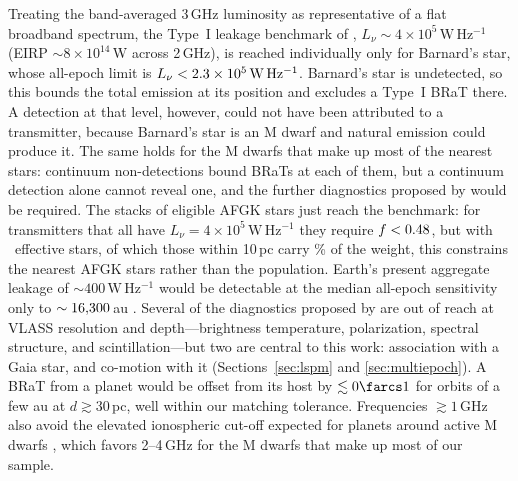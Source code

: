 \documentclass[linenumbers]{aastex702}
\newcommand{\Lnu}{L_\nu}
\newcommand{\WHz}{\mathrm{W\,Hz^{-1}}}
\begin{document}
Treating the band-averaged 3\,GHz luminosity as representative of a flat broadband spectrum, the Type~I leakage benchmark of \citet{Garrett2026}, $\Lnu\sim4\times10^5\,\WHz$ (EIRP $\sim8\times10^{14}$\,W across 2\,GHz), is reached individually only for Barnard's star, whose all-epoch limit is $\Lnu<\BarnardLAll\,\WHz$. Barnard's star is undetected, so this bounds the total emission at its position and excludes a Type~I BRaT there. A detection at that level, however, could not have been attributed to a transmitter, because Barnard's star is an M dwarf and natural emission could produce it. The same holds for the M dwarfs that make up most of the nearest stars: continuum non-detections bound BRaTs at each of them, but a continuum detection alone cannot reveal one, and the further diagnostics proposed by \citet{Garrett2026} would be required. The stacks of eligible AFGK stars just reach the benchmark: for transmitters that all have $\Lnu=4\times10^5\,\WHz$ they require $f<0.48$, but with \NeffBratAFGK\ effective stars, of which those within 10\,pc carry \WtenBratAFGK\% of the weight, this constrains the nearest AFGK stars rather than the population. Earth's present aggregate leakage of $\sim400\,\WHz$ would be detectable at the median all-epoch sensitivity only to $\sim16{,}300$\,au \citep[see also][]{Sheikh2025}. Several of the diagnostics proposed by \citet{Garrett2026} are out of reach at VLASS resolution and depth---brightness temperature, polarization, spectral structure, and scintillation---but two are central to this work: association with a Gaia star, and co-motion with it (Sections~\ref{sec:lspm} and \ref{sec:multiepoch}). A BRaT from a planet would be offset from its host by $\lesssim0\farcs1$ for orbits of a few au at $d\gtrsim30$\,pc, well within our matching tolerance. Frequencies $\gtrsim1$\,GHz also avoid the elevated ionospheric cut-off expected for planets around active M dwarfs \citep{Garrett2026,GarrettIono2026}, which favors 2--4\,GHz for the M dwarfs that make up most of our sample.
\end{document}
